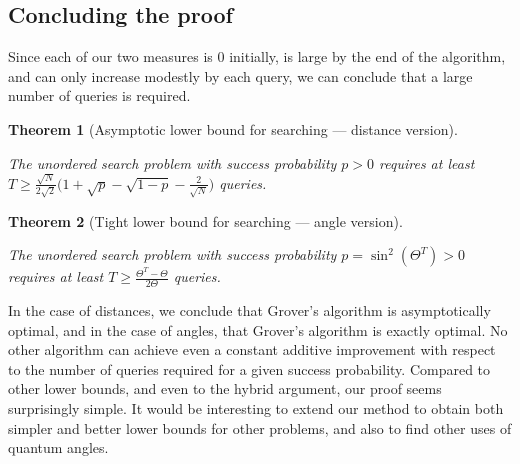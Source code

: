 \documentclass{article}
\newtheorem{theorem}{Theorem}
\begin{document}
\subsection{Concluding the proof}
 
Since each of our two measures is 0 initially, is large by the end of
the algorithm, and can only increase modestly by each query, we can
conclude that a large number of queries is required.

\begin{theorem}[Asymptotic lower bound for searching --- distance
  version] \label{thm:cs} 

  The unordered search pro\-blem with success probability $p>0$ requires
  at least $T \geq \frac{\sqrt{N}}{2\sqrt 2} \Big( 1 + \sqrt{p} -
  \sqrt{1-p} - \frac{2}{\sqrt N}\Big)$ queries.
\end{theorem}

\begin{theorem}[Tight lower bound for searching --- angle
  version] \label{thm:cs:angle} 

  The unordered search problem with success probability $p =
  \sin^2(\Theta^T)>0$ requires at least $T \geq \frac{\Theta^T -
    \Theta}{2 \Theta}$ queries.
\end{theorem}

In the case of distances, we conclude that Grover's algorithm is
asymptotically optimal, and in the case of angles, that Grover's
algorithm is exactly optimal.  No other algorithm can achieve even a
constant additive improvement with respect to the number of queries
required for a given success probability.  Compared to other lower
bounds, and even to the hybrid argument, our proof seems surprisingly
simple.  It would be interesting to extend our method to obtain both
simpler and better lower bounds for other problems, and also to find
other uses of quantum angles.
 
\end{document}
